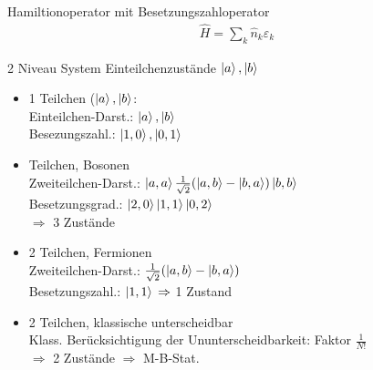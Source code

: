 \begin{definition}{Hamiltionoperator mit Besetzungszahloperator}
    \begin{align}
        \hat{H} = \sum_k \hat{n}_k \varepsilon_k
    \end{align}
\end{definition}


\begin{beispiel}{2 Niveau System}
    Einteilchenzustände $\ket{a},\ket{b}$
    \begin{multicols}{2}
       \begin{itemize}
        \item 1 Teilchen ($\ket{a},\ket{b}$:\\
        Einteilchen-Darst.: $\ket{a},\ket{b}$\\
        Besezungszahl.: $\ket{1,0},\ket{0,1}$
        \item Teilchen, Bosonen\\
        Zweiteilchen-Darst.: $\ket{a,a} \frac{1}{\sqrt{2}}(\ket{a,b}-\ket{b,a}) \ket{b,b}$\\
        Besetzungsgrad.: $\ket{2,0} \ket{1,1} \ket{0,2}$\\
        $\Rightarrow$ 3 Zustände
        \item 2 Teilchen, Fermionen\\
        Zweiteilchen-Darst.: $\frac{1}{\sqrt{2}}(\ket{a,b}-\ket{b,a})$\\
        Besetzungszahl.: $\ket{1,1}\\
        \Rightarrow$ 1 Zustand
        \item 2 Teilchen, klassische unterscheidbar\\
        Klass. Berücksichtigung der Ununterscheidbarkeit: Faktor $\frac{1}{N!}$\\
        $\Rightarrow$ 2 Zustände
        $\Rightarrow$ M-B-Stat.
        \end{itemize} 
        \begin{center}
\end{center}
\end{multicols}
\end{beispiel}
